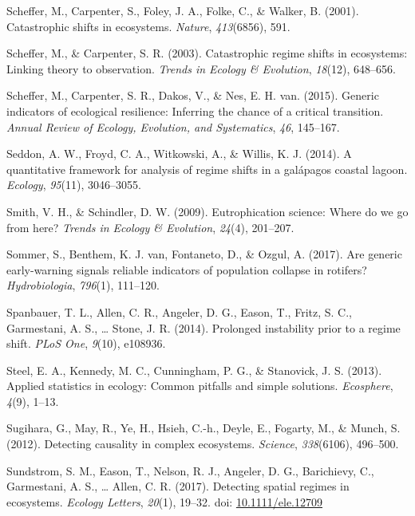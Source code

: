 \documentclass[12pt,twoside,openany]{reedthesis}
\begin{document}
\leavevmode\hypertarget{ref-scheffer_catastrophic_2001}{}%
Scheffer, M., Carpenter, S., Foley, J. A., Folke, C., \& Walker, B. (2001). Catastrophic shifts in ecosystems. \emph{Nature}, \emph{413}(6856), 591.

\leavevmode\hypertarget{ref-scheffer2003catastrophic}{}%
Scheffer, M., \& Carpenter, S. R. (2003). Catastrophic regime shifts in ecosystems: Linking theory to observation. \emph{Trends in Ecology \& Evolution}, \emph{18}(12), 648--656.

\leavevmode\hypertarget{ref-scheffer2015generic}{}%
Scheffer, M., Carpenter, S. R., Dakos, V., \& Nes, E. H. van. (2015). Generic indicators of ecological resilience: Inferring the chance of a critical transition. \emph{Annual Review of Ecology, Evolution, and Systematics}, \emph{46}, 145--167.

\leavevmode\hypertarget{ref-seddon2014quantitative}{}%
Seddon, A. W., Froyd, C. A., Witkowski, A., \& Willis, K. J. (2014). A quantitative framework for analysis of regime shifts in a galápagos coastal lagoon. \emph{Ecology}, \emph{95}(11), 3046--3055.

\leavevmode\hypertarget{ref-smith2009eutrophication}{}%
Smith, V. H., \& Schindler, D. W. (2009). Eutrophication science: Where do we go from here? \emph{Trends in Ecology \& Evolution}, \emph{24}(4), 201--207.

\leavevmode\hypertarget{ref-sommer2017generic}{}%
Sommer, S., Benthem, K. J. van, Fontaneto, D., \& Ozgul, A. (2017). Are generic early-warning signals reliable indicators of population collapse in rotifers? \emph{Hydrobiologia}, \emph{796}(1), 111--120.

\leavevmode\hypertarget{ref-spanbauer_prolonged_2014}{}%
Spanbauer, T. L., Allen, C. R., Angeler, D. G., Eason, T., Fritz, S. C., Garmestani, A. S., \ldots{} Stone, J. R. (2014). Prolonged instability prior to a regime shift. \emph{PLoS One}, \emph{9}(10), e108936.

\leavevmode\hypertarget{ref-steel2013applied}{}%
Steel, E. A., Kennedy, M. C., Cunningham, P. G., \& Stanovick, J. S. (2013). Applied statistics in ecology: Common pitfalls and simple solutions. \emph{Ecosphere}, \emph{4}(9), 1--13.

\leavevmode\hypertarget{ref-sugihara2012detecting}{}%
Sugihara, G., May, R., Ye, H., Hsieh, C.-h., Deyle, E., Fogarty, M., \& Munch, S. (2012). Detecting causality in complex ecosystems. \emph{Science}, \emph{338}(6106), 496--500.

\leavevmode\hypertarget{ref-sundstrom2017detecting}{}%
Sundstrom, S. M., Eason, T., Nelson, R. J., Angeler, D. G., Barichievy, C., Garmestani, A. S., \ldots{} Allen, C. R. (2017). Detecting spatial regimes in ecosystems. \emph{Ecology Letters}, \emph{20}(1), 19--32. doi: \href{https://doi.org/10.1111/ele.12709}{10.1111/ele.12709}
\end{document}
